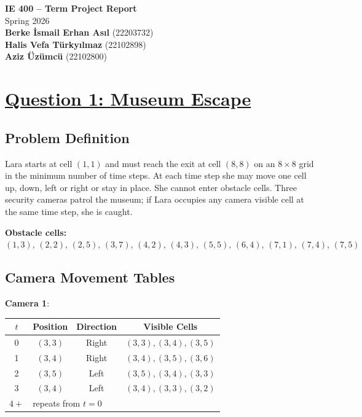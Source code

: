 \documentclass[12pt,a4paper]{article}
\begin{document}
\begin{center}
{\Large\textbf{IE 400 -- Term Project Report}}\\[4pt]
Spring 2026\\[8pt]
\textbf{Berke \.{I}smail Erhan As{\i}l} \quad (22203732)\\[2pt]
\textbf{Halis Vefa T\"{u}rky{\i}lmaz} \quad (22102898)\\[2pt]
\textbf{Aziz \"{U}z\"{u}mc\"{u}} \quad (22102800)
\end{center}

\bigskip

\section*{\underline{Question 1: Museum Escape}}

\subsection*{Problem Definition}

Lara starts at cell $(1,1)$ and must reach the exit at cell $(8,8)$ on an $8\times8$ grid
in the minimum number of time steps. At each time step she may move one cell up, down,
left or right or stay in place. She cannot enter obstacle cells. Three security cameras
patrol the museum; if Lara occupies any camera visible cell at the same time step, she is
caught.

\textbf{Obstacle cells:}
$(1,3),\,(2,2),\,(2,5),\,(3,7),\,(4,2),\,(4,3),\,(5,5),\,(6,4),\,(7,1),\,(7,4),\,(7,5)$

\subsection*{Camera Movement Tables}

\textbf{Camera 1}:

\begin{center}
\begin{tabular}{cccc}
\toprule
$t$ & Position & Direction & Visible Cells \\
\midrule
0   & $(3,3)$ & Right & $(3,3),(3,4),(3,5)$ \\
1   & $(3,4)$ & Right & $(3,4),(3,5),(3,6)$ \\
2   & $(3,5)$ & Left  & $(3,5),(3,4),(3,3)$ \\
3   & $(3,4)$ & Left  & $(3,4),(3,3),(3,2)$ \\
$4+$ & \multicolumn{3}{l}{repeats from $t=0$} \\
\bottomrule
\end{tabular}
\end{center}
\end{document}
